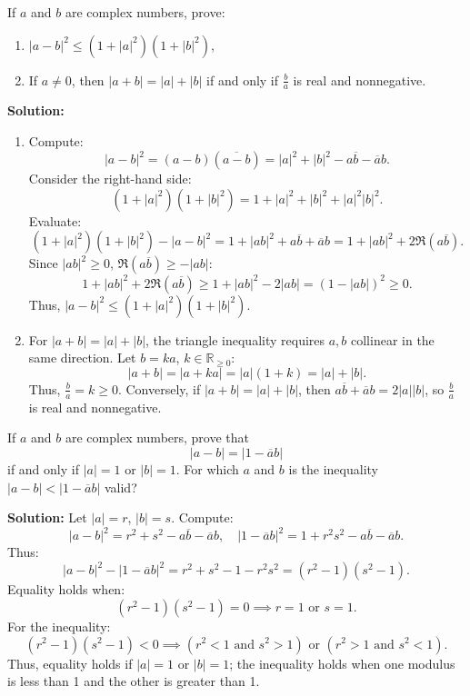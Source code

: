 \begin{problembox}
If \( a \) and \( b \) are complex numbers, prove:
\begin{enumerate}[label=\alph*)]
\item \( |a - b|^2 \leq (1 + |a|^2)(1 + |b|^2) \),
\item If \( a \neq 0 \), then \( |a + b| = |a| + |b| \) if and only if \( \frac{b}{a} \) is real and nonnegative.
\end{enumerate}
\end{problembox}

\textbf{Solution:}
\begin{enumerate}[label=\alph*)]
\item Compute:
\[
|a - b|^2 = (a - b)(\overline{a - b}) = |a|^2 + |b|^2 - a\overline{b} - \overline{a}b.
\]
Consider the right-hand side:
\[
(1 + |a|^2)(1 + |b|^2) = 1 + |a|^2 + |b|^2 + |a|^2 |b|^2.
\]
Evaluate:
\[
(1 + |a|^2)(1 + |b|^2) - |a - b|^2 = 1 + |a b|^2 + a\overline{b} + \overline{a}b = 1 + |a b|^2 + 2\Re(a\overline{b}).
\]
Since \( |a b|^2 \geq 0 \), \( \Re(a\overline{b}) \geq -|a b| \):
\[
1 + |a b|^2 + 2\Re(a\overline{b}) \geq 1 + |a b|^2 - 2|a b| = (1 - |a b|)^2 \geq 0.
\]
Thus, \( |a - b|^2 \leq (1 + |a|^2)(1 + |b|^2) \).
\item For \( |a + b| = |a| + |b| \), the triangle inequality requires \( a, b \) collinear in the same direction. Let \( b = ka \), \( k \in \mathbb{R}_{\geq 0} \):
\[
|a + b| = |a + ka| = |a|(1 + k) = |a| + |b|.
\]
Thus, \( \frac{b}{a} = k \geq 0 \). Conversely, if \( |a + b| = |a| + |b| \), then \( a\overline{b} + \overline{a}b = 2|a||b| \), so \( \frac{b}{a} \) is real and nonnegative.
\end{enumerate}

\begin{problembox}
If \( a \) and \( b \) are complex numbers, prove that
\[
|a - b| = |1 - \overline{a}b|
\]
if and only if \( |a| = 1 \) or \( |b| = 1 \). For which \( a \) and \( b \) is the inequality \( |a - b| < |1 - \overline{a}b| \) valid?
\end{problembox}

\textbf{Solution:}
Let \( |a| = r \), \( |b| = s \). Compute:
\[
|a - b|^2 = r^2 + s^2 - a\overline{b} - \overline{a}b, \quad |1 - \overline{a}b|^2 = 1 + r^2 s^2 - a\overline{b} - \overline{a}b.
\]
Thus:
\[
|a - b|^2 - |1 - \overline{a}b|^2 = r^2 + s^2 - 1 - r^2 s^2 = (r^2 - 1)(s^2 - 1).
\]
Equality holds when:
\[
(r^2 - 1)(s^2 - 1) = 0 \implies r = 1 \text{ or } s = 1.
\]
For the inequality:
\[
(r^2 - 1)(s^2 - 1) < 0 \implies (r^2 < 1 \text{ and } s^2 > 1) \text{ or } (r^2 > 1 \text{ and } s^2 < 1).
\]
Thus, equality holds if \( |a| = 1 \) or \( |b| = 1 \); the inequality holds when one modulus is less than 1 and the other is greater than 1.

